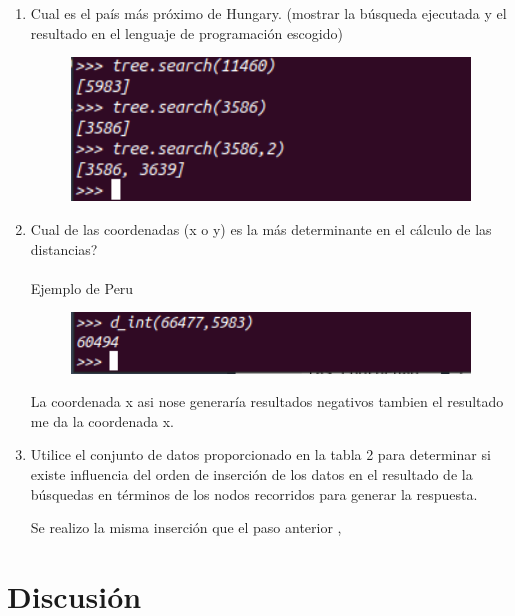 \documentclass[a4paper]{article}
\begin{document}
\begin{enumerate}
\item Cual es el país más próximo de Hungary. (mostrar la búsqueda ejecutada y el resultado en el lenguaje de programación
escogido)


\begin{figure}[H]
  \centering
  \includegraphics[width=1\textwidth]{imagenes/Captura de pantalla de 2021-12-16 10-10-22.png}
\end{figure}


\item Cual de las coordenadas (x o y) es la más determinante en el cálculo de las distancias?\\\\
Ejemplo de Peru
\begin{figure}[H]
  \centering
  \includegraphics[width=1\textwidth]{imagenes/Captura de pantalla de 2021-12-16 10-13-51.png}
\end{figure}

La coordenada x asi nose generaría resultados negativos tambien el resultado me da la coordenada x. 

\item Utilice el conjunto de datos proporcionado en la tabla 2 para determinar si existe influencia del orden de inserción de los
datos en el resultado de la búsquedas en términos de los nodos recorridos para generar la respuesta.

Se realizo la misma inserción que el paso anterior ,





\end{enumerate}



\section{Discusión}
\end{document}
